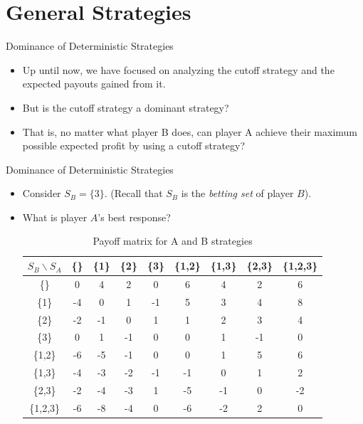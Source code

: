 \documentclass[aspectratio=169]{beamer}
\begin{document}
\section{General Strategies}
\frame{\sectionpage}
\begin{frame}{Dominance of Deterministic Strategies}
\begin{itemize}
    \item Up until now, we have focused on analyzing the cutoff strategy and the expected payouts gained from it. \pause
    \item But is the cutoff strategy a dominant strategy? 
    \pause
    \item That is, no matter what player B does, can player A achieve their maximum possible expected profit by using a cutoff strategy?
\end{itemize}
\end{frame}
\begin{frame}{Dominance of Deterministic Strategies}
\begin{itemize}
      \item Consider $S_B = \{3\}.$ (Recall that $S_B$ is the \textit{betting set} of player $B$). \pause
    \item What is player $A$'s best response? \pause
    \begin{table}[H]
    \centering
    \begin{tabular}{|c|c|c|c|c|c|c|c|c|}
        \hline
        $S_B \backslash S_A$ & \{\} & \{1\} & \{2\} & \{3\} & \{1,2\} & \{1,3\} & \{2,3\} & \{1,2,3\} \\ 
        \hline
        \{\}      & 0  & 4  & 2  & 0  & 6  & 4  & 2  & 6 \\ \hline 
        \{1\}      & -4 & 0  & 1  & -1 & 5  & 3  & 4  & 8  \\ \hline 
        \{2\}      & -2 & -1 & 0  & 1  & 1  & 2  & 3  & 4  \\ \hline 
        \{3\}      & 0  & 1  & -1 & 0  & 0  & 1 & -1 & 0  \\ \hline 
        \{1,2\}    & -6 & -5 & -1 & 0  & 0  & 1  & 5  & 6  \\ \hline 
        \{1,3\}    & -4 & -3 & -2 & -1 & -1 & 0  & 1  & 2  \\ \hline 
        \{2,3\}    & -2 & -4 & -3 & 1  & -5 & -1 & 0  & -2 \\ \hline 
        \{1,2,3\}  & -6 & -8 & -4 & 0  & -6 & -2 & 2  & 0  \\ \hline 
        \hline
    \end{tabular} 
   \caption{Payoff matrix for A and B strategies}
\end{table}
\end{itemize}
\end{frame}
\end{document}

